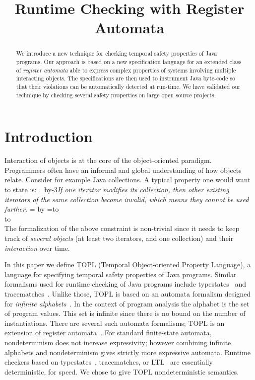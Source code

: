 \documentclass{sigplanconf}[10pt] %
\title{Runtime Checking with Register Automata}
\newcommand{\eqquote}[2]{{%
  \refstepcounter{equation}\label{#2}%
  \setbox0=\vbox{\advance\hsize by-3\parindent\noindent\em#1}%
  \newdimen\x\x=\ht0 \advance\x by\dp0%
  \setbox1=\vbox to\x{\vss\hbox{(\arabic{equation})}\vss}%
  \leavevmode\\[1ex]%
  \hbox to\hsize{\hskip 1.5\parindent\box0\hfil\box1}%
  \\[1ex]}}
\begin{document}
\maketitle

\begin{abstract} %
We introduce a new technique for checking temporal safety properties of Java programs.
Our approach is based on a new specification language for an extended class of {\em register automata} able to express complex properties of systems involving multiple interacting objects.
The specifications are then used to instrument Java byte-code so that their violations can be automatically detected at run-time.
We have validated our technique by checking several safety properties on large open source projects.
\end{abstract}

\section{Introduction} %

Interaction of objects is at the core of the object-oriented paradigm.
Programmers often have an informal and global understanding of how objects relate.
Consider for example Java collections.
A typical property one would want to state is:
\eqquote{If one iterator modifies its collection, then other existing iterators of the same collection become invalid, which means they cannot be used further.}{q:concur-it}
The formalization of the above constraint is non-trivial since it needs to keep track of {\em several objects} (at least two iterators, and one collection) and their {\em interaction} over time.

In this paper we define TOPL (Temporal Object-oriented Property Language), a language for specifying temporal safety properties of Java programs.
Similar formalisms used for runtime checking of Java programs include typestates~\cite{dblp:journals/scp/harel87} and tracematches~\cite{dblp:conf/oopsla/allanachklmsst05}.
Unlike those, TOPL is based on an automata formalism designed for {\em infinite alphabets}~\cite{dblp:conf/csl/segoufin06}.
In the context of program analysis the alphabet is the set of program values.
This set is infinite since there is no bound on the number of instantiations.
There are several such automata formalisms;
TOPL is an extension of register automata~\cite{dblp:journals/tcs/kaminskif94}.
For standard finite-state automata, nondeterminism does not increase expressivity;
however combining  infinite alphabets and nondeterminism gives strictly more expressive automata. 
Runtime checkers based on typestates~\cite{arnold:2008}, tracematches, or LTL~\cite{dblp:conf/oopsla/chenr07} are essentially deterministic, for speed.
We chose to give TOPL nondeterministic semantics.
\end{document}
